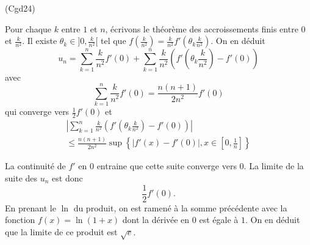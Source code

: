 \begin{tiny}(Cgd24)\end{tiny} Pour chaque $k$ entre $1$ et $n$, écrivons le théorème des accroissements finis entre $0$ et $\frac{k}{n^2}$. Il existe $\theta_k\in ]0,\frac{k}{n^2}[$ tel que $f(\frac{k}{n^2})=\frac{k}{n^2}f'(\theta_k \frac{k}{n^2})$. On en déduit
\begin{displaymath}
 u_n = \sum_{k=1}^n\frac{k}{n^2}f'(0)+\sum_{k=1}^n\frac{k}{n^2}\left(f'(\theta_k \frac{k}{n^2})- f'(0)\right) 
\end{displaymath}
avec
\begin{displaymath}
 \sum_{k=1}^n\frac{k}{n^2}f'(0) = \frac{n(n+1)}{2n^2}f'(0)
\end{displaymath}
qui converge vers $\frac{1}{2}f'(0)$ et
\begin{multline*}
 \left|\sum_{k=1}^n\frac{k}{n^2}\left(f'(\theta_k \frac{k}{n^2})- f'(0)\right)\right|\\
 \leq
\frac{n(n+1)}{2n^2} \sup\left\lbrace |f'(x)-f'(0)|, x\in [0,\frac{1}{n}]\right\rbrace 
\end{multline*}

La continuité de $f'$ en $0$ entraine que cette suite converge vers $0$. La limite de la suite des $u_n$ est donc
\begin{displaymath}
 \frac{1}{2}f'(0).
\end{displaymath}
En prenant le $\ln$ du produit, on est ramené à la somme précédente avec la fonction $f(x) = \ln(1+x)$ dont la dérivée en $0$ est égale à $1$. On en déduit que la limite de ce produit est $\sqrt{e}$.

